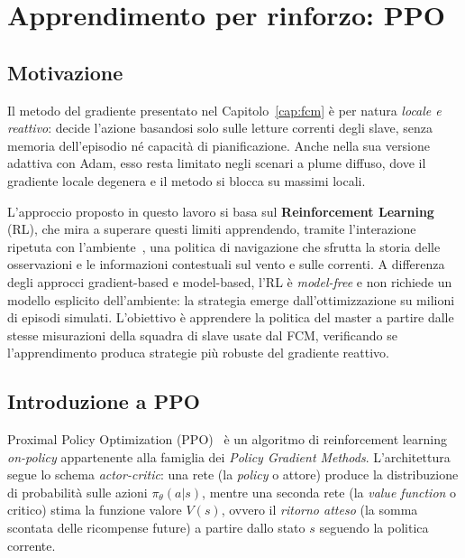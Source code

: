 \chapter{Apprendimento per rinforzo: PPO}
\label{cap:rl}

\section{Motivazione}
\label{sec:rl_motiv}

Il metodo del gradiente presentato nel Capitolo~\ref{cap:fcm} \`e per natura
\emph{locale e reattivo}: decide l'azione basandosi solo sulle letture correnti degli
slave, senza memoria dell'episodio n\'e capacit\`a di pianificazione. Anche nella sua
versione adattiva con Adam, esso resta limitato negli scenari a plume diffuso, dove il
gradiente locale degenera e il metodo si blocca su massimi locali.

L'approccio proposto in questo lavoro si basa sul \textbf{Reinforcement Learning} (RL),
che mira a superare questi limiti apprendendo, tramite l'interazione ripetuta con
l'ambiente~\citep{sutton_barto}, una politica di navigazione che sfrutta la storia delle
osservazioni e le informazioni contestuali sul vento e sulle correnti. A differenza degli
approcci gradient-based e model-based, l'RL \`e \emph{model-free} e non richiede un
modello esplicito dell'ambiente: la strategia emerge dall'ottimizzazione su milioni di
episodi simulati. L'obiettivo \`e apprendere la politica del master a partire dalle stesse
misurazioni della squadra di slave usate dal FCM, verificando se l'apprendimento
produca strategie pi\`u robuste del gradiente reattivo.

\section{Introduzione a PPO}
\label{sec:ppo}

Proximal Policy Optimization (PPO)~\citep{ppo} \`e un algoritmo di reinforcement
learning \emph{on-policy} appartenente alla famiglia dei \emph{Policy Gradient Methods}.
L'architettura segue lo schema \emph{actor-critic}: una rete (la \emph{policy} o attore)
produce la distribuzione di probabilit\`a sulle azioni $\pi_\theta(a|s)$, mentre una
seconda rete (la \emph{value function} o critico) stima la funzione valore $V(s)$, ovvero
il \emph{ritorno atteso} (la somma scontata delle ricompense future) a partire dallo
stato $s$ seguendo la politica corrente.

